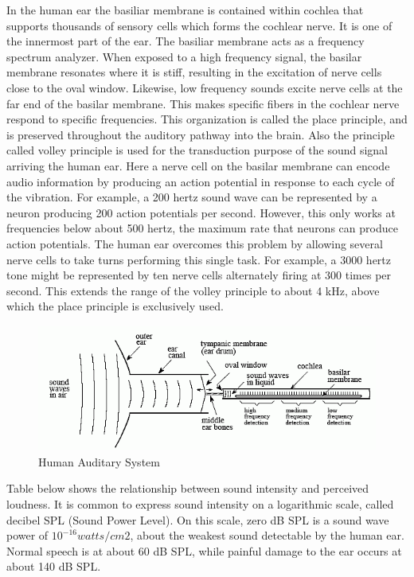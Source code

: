 In the human ear the basiliar membrane is contained within cochlea that supports thousands of sensory cells which forms the cochlear nerve. It is one of the innermost part of the ear. The basiliar membrane acts as a frequency spectrum analyzer. When exposed to a high frequency signal, the basilar membrane
resonates where it is stiff, resulting in the excitation of nerve cells close to the oval window.
Likewise, low frequency sounds excite nerve cells at the far end of the basilar membrane. This
makes specific fibers in the cochlear nerve respond to specific frequencies. This organization
is called the place principle, and is preserved throughout the auditory pathway into the brain. Also the principle called volley principle is used for the transduction purpose of the sound signal arriving the human ear. Here a nerve cell on the basilar membrane can encode audio information by producing an action potential in response to each cycle of the vibration. For example, a 200 hertz sound wave can be represented by a neuron producing 200 action potentials per second. However, this only works at frequencies below about 500 hertz, the maximum rate that neurons can produce action potentials. The human ear overcomes this problem by allowing several nerve cells to take turns performing this single task. For example, a 3000 hertz tone might be represented by ten nerve cells alternately firing at 300 times per second. This extends the range of the volley principle to about 4 kHz, above which the place principle is exclusively used.

\begin{figure}[h]
	\begin{center}
		\includegraphics[scale=0.8]{images/human.png}
		\caption{Human Auditary System}
	\end{center}
\end{figure}



Table  below  shows the relationship between sound intensity and perceived loudness. It is common to express sound intensity on a logarithmic scale, called decibel SPL (Sound Power Level). On this scale, zero dB SPL is a sound wave power of $10^{-16} watts/cm2$, about the weakest sound detectable by the human ear. Normal speech is at about 60 dB SPL, while painful damage to the ear occurs at about 140 dB SPL.

